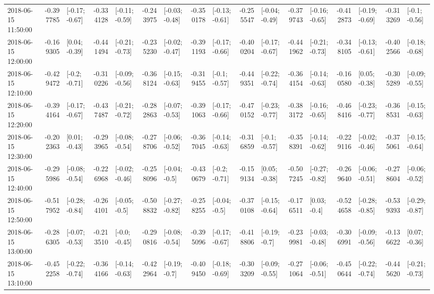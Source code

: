 \begin{tabular}{lrlrlrlrlrlrlrlrl}
2018-06-15 11:50:00 & -0.397785 &  [-0.17; -0.67] & -0.334128 &  [-0.11; -0.59] & -0.243975 &  [-0.03; -0.48] & -0.350178 &  [-0.13; -0.61] & -0.255547 &  [-0.04; -0.49] & -0.379743 &  [-0.16; -0.65] & -0.412873 &  [-0.19; -0.69] & -0.313269 &   [-0.1; -0.56] \\
2018-06-15 12:00:00 & -0.169305 &   [0.04; -0.39] & -0.441494 &  [-0.21; -0.73] & -0.235230 &  [-0.02; -0.47] & -0.391193 &  [-0.17; -0.66] & -0.400204 &  [-0.17; -0.67] & -0.441962 &  [-0.21; -0.73] & -0.348105 &  [-0.13; -0.61] & -0.402566 &  [-0.18; -0.68] \\
2018-06-15 12:10:00 & -0.429472 &   [-0.2; -0.71] & -0.310226 &  [-0.09; -0.56] & -0.368124 &  [-0.15; -0.63] & -0.319455 &   [-0.1; -0.57] & -0.449351 &  [-0.22; -0.74] & -0.364154 &  [-0.14; -0.63] & -0.160580 &   [0.05; -0.38] & -0.305289 &  [-0.09; -0.55] \\
2018-06-15 12:20:00 & -0.394164 &  [-0.17; -0.67] & -0.437487 &  [-0.21; -0.72] & -0.282863 &  [-0.07; -0.53] & -0.391063 &  [-0.17; -0.66] & -0.470152 &  [-0.23; -0.77] & -0.383172 &  [-0.16; -0.65] & -0.468416 &  [-0.23; -0.77] & -0.368531 &  [-0.15; -0.63] \\
2018-06-15 12:30:00 & -0.202363 &   [0.01; -0.43] & -0.293965 &  [-0.08; -0.54] & -0.278706 &  [-0.06; -0.52] & -0.367045 &  [-0.14; -0.63] & -0.316859 &   [-0.1; -0.57] & -0.358391 &  [-0.14; -0.62] & -0.229116 &  [-0.02; -0.46] & -0.375061 &  [-0.15; -0.64] \\
2018-06-15 12:40:00 & -0.295986 &  [-0.08; -0.54] & -0.226968 &  [-0.02; -0.46] & -0.258096 &   [-0.04; -0.5] & -0.430679 &   [-0.2; -0.71] & -0.159134 &   [0.05; -0.38] & -0.507245 &  [-0.27; -0.82] & -0.269640 &  [-0.06; -0.51] & -0.278604 &  [-0.06; -0.52] \\
2018-06-15 12:50:00 & -0.517952 &  [-0.28; -0.84] & -0.264101 &   [-0.05; -0.5] & -0.508832 &  [-0.27; -0.82] & -0.258255 &   [-0.04; -0.5] & -0.370108 &  [-0.15; -0.64] & -0.176511 &    [0.03; -0.4] & -0.524658 &  [-0.28; -0.85] & -0.539393 &  [-0.29; -0.87] \\
2018-06-15 13:00:00 & -0.286305 &  [-0.07; -0.53] & -0.213510 &   [-0.0; -0.45] & -0.290816 &  [-0.08; -0.54] & -0.395096 &  [-0.17; -0.67] & -0.418806 &   [-0.19; -0.7] & -0.239981 &  [-0.03; -0.48] & -0.306991 &  [-0.09; -0.56] & -0.136622 &   [0.07; -0.36] \\
2018-06-15 13:10:00 & -0.452258 &  [-0.22; -0.74] & -0.364166 &  [-0.14; -0.63] & -0.422964 &   [-0.19; -0.7] & -0.409450 &  [-0.18; -0.69] & -0.303209 &  [-0.09; -0.55] & -0.271064 &  [-0.06; -0.51] & -0.450644 &  [-0.22; -0.74] & -0.445620 &  [-0.21; -0.73] \\

\end{tabular}
